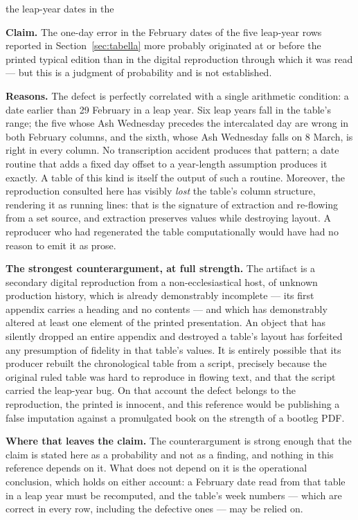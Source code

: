 \begin{synthesis}{the leap-year dates in the }

\textbf{Claim.} The one-day error in the February dates of the five leap-year rows reported in
Section~\ref{sec:tabella} more probably originated at or before the printed typical edition than in
the digital reproduction through which it was read --- but this is a judgment of probability and is
not established.

\textbf{Reasons.} The defect is perfectly correlated with a single arithmetic condition: a date
earlier than 29 February in a leap year. Six leap years fall in the table's range; the five whose Ash
Wednesday precedes the intercalated day are wrong in both February columns, and the sixth, whose Ash
Wednesday falls on 8 March, is right in every column. No transcription accident produces that
pattern; a date routine that adds a fixed day offset to a year-length assumption produces it exactly.
A table of this kind is itself the output of such a routine. Moreover, the reproduction consulted
here has visibly \emph{lost} the table's column structure, rendering it as running lines: that is the
signature of extraction and re-flowing from a set source, and extraction preserves values while
destroying layout. A reproducer who had regenerated the table computationally would have had no
reason to emit it as prose.

\textbf{The strongest counterargument, at full strength.} The artifact is a secondary digital
reproduction from a non-ecclesiastical host, of unknown production history, which is already
demonstrably incomplete --- its first appendix carries a heading and no contents --- and which has
demonstrably altered at least one element of the printed presentation. An object that has silently
dropped an entire appendix and destroyed a table's layout has forfeited any presumption of fidelity
in that table's values. It is entirely possible that its producer rebuilt the chronological table
from a script, precisely because the original ruled table was hard to reproduce in flowing text, and
that the script carried the leap-year bug. On that account the defect belongs to the reproduction,
the printed  is innocent, and this reference would be publishing a false
imputation against a promulgated book on the strength of a bootleg PDF.

\textbf{Where that leaves the claim.} The counterargument is strong enough that the claim is stated
here as a probability and not as a finding, and nothing in this reference depends on it. What does
not depend on it is the operational conclusion, which holds on either account: a February date read
from that table in a leap year must be recomputed, and the table's week numbers --- which are correct
in every row, including the defective ones --- may be relied on.


\end{synthesis}
